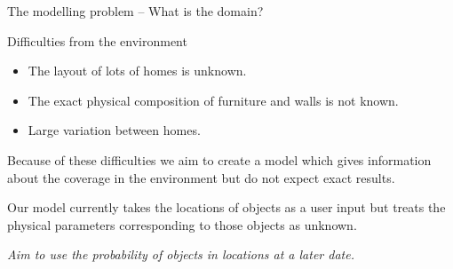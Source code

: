 \documentclass[8pt]{beamer}
\begin{document}
\begin{frame}{The modelling problem -- What is the domain?}
\begin{block}{Difficulties from the environment}
\begin{itemize}
\item The layout of lots of homes is unknown.
\item The exact physical composition of furniture and walls is not known.
\item Large variation between homes.
\end{itemize}
Because of these difficulties we aim to create a model which gives information about the coverage in the environment but do not expect exact results.
\par Our model currently takes the locations of objects as a user input but treats the physical parameters corresponding to those objects as unknown. 
\par \textit{Aim to use the probability of objects in locations at a later date.}
\end{block}
\end{frame}
\end{document}
